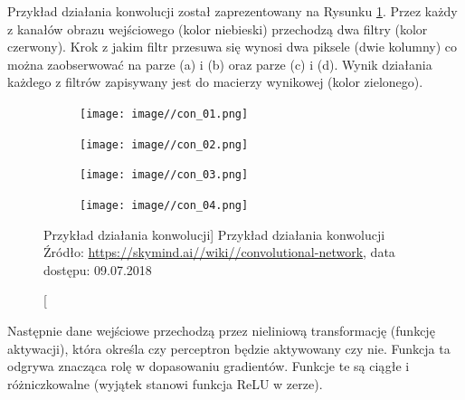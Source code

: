\documentclass[a4paper,12pt]{article}
\begin{document}
            Przykład działania konwolucji został zaprezentowany na Rysunku \ref{fig:przykladDzialaniaKonwolucji}. 
            Przez każdy z kanałów obrazu wejściowego (kolor niebieski) przechodzą dwa filtry (kolor czerwony). Krok z jakim filtr przesuwa się wynosi dwa piksele (dwie kolumny) co można zaobserwować na parze (a) i (b) oraz parze (c) i (d). Wynik działania każdego z filtrów zapisywany jest do macierzy wynikowej (kolor zielonego). 
            
            
		    \newpage
		    
    	    \begin{figure}[h!]
                \centering
                \begin{subfigure}[b]{0.47\linewidth}
                    \texttt{[image: image//con\_01.png]}
					\caption{}
                \end{subfigure}
                \begin{subfigure}[b]{0.47\linewidth}
                     \texttt{[image: image//con\_02.png]}
					\caption{}
                \end{subfigure}
                \newline
                
				\begin{subfigure}[b]{0.47\linewidth}
                    \texttt{[image: image//con\_03.png]}
					\caption{}
                \end{subfigure}
                \begin{subfigure}[b]{0.47\linewidth}
                    \texttt{[image: image//con\_04.png]}
					\caption{}
                \end{subfigure}
                \caption
                    [Przykład działania konwolucji]
					{Przykład działania konwolucji \\  Źródło: \href{https://skymind.ai//wiki//convolutional-network}{\url{https://skymind.ai//wiki//convolutional-network}}, 
					data dostępu: 09.07.2018}
					\label{fig:przykladDzialaniaKonwolucji}
            \end{figure}
        
			Następnie dane wejściowe przechodzą przez nieliniową transformację (funkcję aktywacji), która określa czy perceptron będzie aktywowany czy nie. 
			Funkcja ta odgrywa znacząca rolę w dopasowaniu gradientów. Funkcje te są ciągłe i różniczkowalne (wyjątek stanowi funkcja ReLU w zerze).
        
\end{document}
